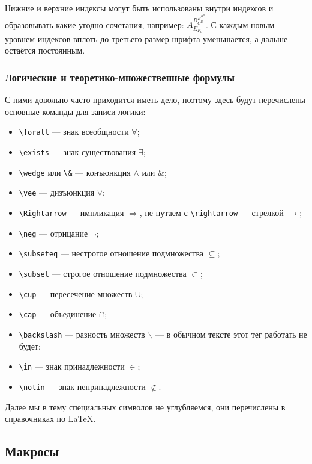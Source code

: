 \documentclass[14pt,russian]{scrartcl}
\begin{document}
Нижние и верхние индексы могут быть использованы внутри индексов и образовывать какие угодно сочетания, например: $A^{B^{B^{B^B}}_{C^D}}_{E_{F_G}}$. С каждым новым уровнем индексов вплоть до третьего размер шрифта уменьшается, а дальше остаётся постоянным.

\subsubsection{Логические и теоретико-множественные формулы}

С ними довольно часто приходится иметь дело, поэтому здесь будут перечислены основные команды для записи логики:
\begin{itemize}
\item \texttt{\textbackslash forall} --- знак всеобщности $\forall$;
\item \texttt{\textbackslash exists} --- знак существования $\exists$;
\item \texttt{\textbackslash wedge} или \texttt{\textbackslash \&} --- конъюнкция $\wedge$ или $\&$;
\item \texttt{\textbackslash vee} --- дизъюнкция $\vee$;
\item \texttt{\textbackslash Rightarrow} --- импликация $\Rightarrow$, не путаем с \texttt{\textbackslash rightarrow} --- стрелкой $\rightarrow$;
\item \texttt{\textbackslash neg} --- отрицание $\neg$;
\item \texttt{\textbackslash subseteq} --- нестрогое отношение подмножества $\subseteq$;
\item \texttt{\textbackslash subset} --- строгое отношение подмножества $\subset$;
\item \texttt{\textbackslash cup} --- пересечение множеств $\cup$;
\item \texttt{\textbackslash cap} --- объединение $\cap$;
\item \texttt{\textbackslash backslash} --- разность множеств $\backslash$ --- в обычном тексте этот тег работать не будет;
\item \texttt{\textbackslash in} --- знак принадлежности $\in$;
\item \texttt{\textbackslash notin} --- знак непринадлежности $\notin$.
\end{itemize}

Далее мы в тему специальных символов не углубляемся, они перечислены в справочниках по \LaTeX.

\subsection{Макросы}\label{Sect::Macros}
\end{document}
